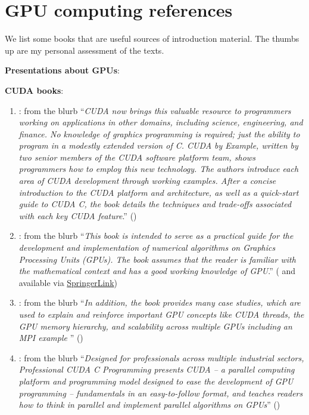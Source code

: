 
\section{GPU computing references}

We list some books that are useful sources of introduction material. The thumbs up are my personal assessment of the texts.

{\bf Presentations about GPUs}:

{\bf CUDA books}:

\begin{enumerate}
    \item \cite{sanders2010cuda}: from the blurb ``\emph{CUDA now brings this valuable resource to programmers working on applications in other domains, including science, engineering, and finance. No knowledge of graphics programming is required; just the ability to program in a modestly extended version of C. CUDA by Example, written by two senior members of the CUDA software platform team, shows programmers how to employ this new technology. The authors introduce each area of CUDA development through working examples. After a concise introduction to the CUDA platform and architecture, as well as a quick-start guide to CUDA C, the book details the techniques and trade-offs associated with each key CUDA feature}.'' (\faThumbsOUp{}\faThumbsOUp{})
    
    \item \cite{kindratenko2014numerical}: from the blurb ``\emph{This book is intended to serve as a practical guide for the development and implementation of numerical algorithms on Graphics Processing Units (GPUs). The book assumes that the 
    reader is familiar with the mathematical context and has a good working knowledge of GPU}.'' (\faThumbsOUp{}\faThumbsOUp{} and available via \href{https://link.springer.com/content/pdf/10.1007/978-3-319-06548-9.pdf}{SpringerLink})
    
    \item \cite{farber2011cuda}: from the blurb ``\emph{In addition, the book provides many case studies, which are used to explain and reinforce important GPU concepts like CUDA threads, the GPU memory hierarchy, and scalability across multiple GPUs including an MPI example }'' (\faThumbsOUp{})
    
    \item \cite{cheng2014professional}: from the blurb ``\emph{Designed for professionals across multiple industrial sectors, Professional CUDA C Programming  presents CUDA -- a parallel computing platform and programming model designed to ease the development of GPU programming -- fundamentals in an easy-to-follow format, and teaches readers how to think in parallel and implement parallel algorithms on GPUs}'' (\faThumbsOUp{})
    

\end{enumerate}
